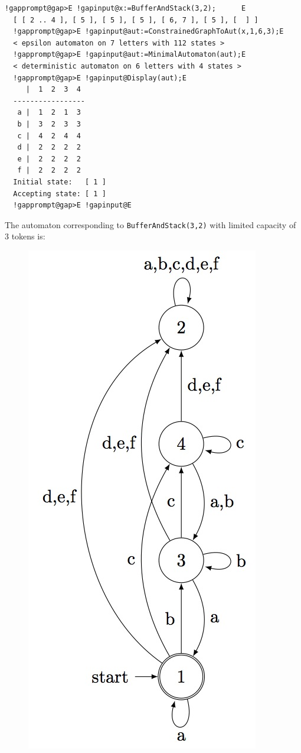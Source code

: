 \documentclass[a4paper,11pt]{report}
\begin{document}
{{{\begin{figure}[H]
\end{figure}   
\begin{Verbatim}[commandchars=!@E,fontsize=\small,frame=single,label=Example]
  !gapprompt@gap>E !gapinput@x:=BufferAndStack(3,2);      E
  [ [ 2 .. 4 ], [ 5 ], [ 5 ], [ 5 ], [ 6, 7 ], [ 5 ], [  ] ]
  !gapprompt@gap>E !gapinput@aut:=ConstrainedGraphToAut(x,1,6,3);E
  < epsilon automaton on 7 letters with 112 states >
  !gapprompt@gap>E !gapinput@aut:=MinimalAutomaton(aut);E
  < deterministic automaton on 6 letters with 4 states >
  !gapprompt@gap>E !gapinput@Display(aut);E
     |  1  2  3  4  
  -----------------
   a |  1  2  1  3  
   b |  3  2  3  3  
   c |  4  2  4  4  
   d |  2  2  2  2  
   e |  2  2  2  2  
   f |  2  2  2  2  
  Initial state:   [ 1 ]
  Accepting state: [ 1 ]
  !gapprompt@gap>E !gapinput@E
\end{Verbatim}
  The automaton corresponding to \texttt{BufferAndStack(3,2)} with limited capacity of 3 tokens is: \begin{figure}[H] \begin{center}
\leavevmode \includegraphics[scale=0.75]{img/bs32c3aut.jpg} \end{center}

\end{figure}}}}
\end{document}
